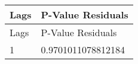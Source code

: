 \begin{tabular}{ll}
\hline
 Lags   & P-Value Residuals   \\
\hline
 Lags   & P-Value Residuals   \\
 1      & 0.9701011078812184  \\
\hline
\end{tabular}